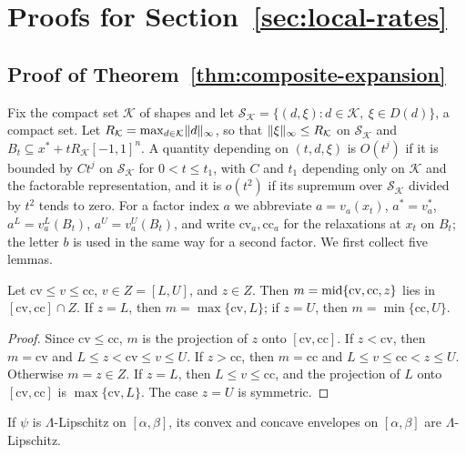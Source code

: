 \section{Proofs for Section~\ref{sec:local-rates}}\label{sec:local-proofs}

\subsection{Proof of Theorem~\ref{thm:composite-expansion}}\label{sec:local-proofs-composite}

Fix the compact set $\mathcal K$ of shapes and let
$\mathcal S_{\mathcal K}=\{(d,\xi):d\in\mathcal K,\ \xi\in D(d)\}$, a compact
set. Let $R_{\mathcal K}=\max_{d\in\mathcal K}\lVert d\rVert_\infty$, so that
$\lVert \xi\rVert_\infty\le R_{\mathcal K}$ on $\mathcal S_{\mathcal K}$ and
$B_t\subseteq x^*+tR_{\mathcal K}[-1,1]^n$. A quantity depending on
$(t,d,\xi)$ is $O(t^j)$ if it is bounded by $Ct^j$ on
$\mathcal S_{\mathcal K}$ for $0<t\le t_1$, with $C$ and $t_1$ depending
only on $\mathcal K$ and the factorable representation, and it is $o(t^2)$
if its supremum over $\mathcal S_{\mathcal K}$ divided by $t^2$ tends to
zero. For a factor index $a$ we abbreviate $a=v_a(x_t)$, $a^*=v_a^*$,
$a^L=v_a^L(B_t)$, $a^U=v_a^U(B_t)$, and write $\mathrm{cv}_a,\mathrm{cc}_a$
for the relaxations at $x_t$ on $B_t$; the letter $b$ is used in the same
way for a second factor. We first collect five lemmas.

\begin{lemma}\label{lem:mid}
Let $\mathrm{cv}\le v\le\mathrm{cc}$, $v\in Z=[L,U]$, and $z\in Z$. Then
$m=\operatorname{mid}\{\mathrm{cv},\mathrm{cc},z\}$ lies in $[\mathrm{cv},\mathrm{cc}]\cap Z$.
If $z=L$, then $m=\max\{\mathrm{cv},L\}$; if $z=U$, then
$m=\min\{\mathrm{cc},U\}$.
\end{lemma}

\begin{proof}
Since $\mathrm{cv}\le\mathrm{cc}$, $m$ is the projection of $z$ onto
$[\mathrm{cv},\mathrm{cc}]$. If $z<\mathrm{cv}$, then $m=\mathrm{cv}$ and
$L\le z<\mathrm{cv}\le v\le U$. If $z>\mathrm{cc}$, then $m=\mathrm{cc}$ and
$L\le v\le\mathrm{cc}<z\le U$. Otherwise $m=z\in Z$. If $z=L$, then
$L\le v\le\mathrm{cc}$, and the projection of $L$ onto $[\mathrm{cv},\mathrm{cc}]$
is $\max\{\mathrm{cv},L\}$. The case $z=U$ is symmetric.
\end{proof}

\begin{lemma}\label{lem:lipschitz-envelope}
If $\psi$ is $\Lambda$-Lipschitz on $[\alpha,\beta]$, its convex and concave
envelopes on $[\alpha,\beta]$ are $\Lambda$-Lipschitz.
\end{lemma}

